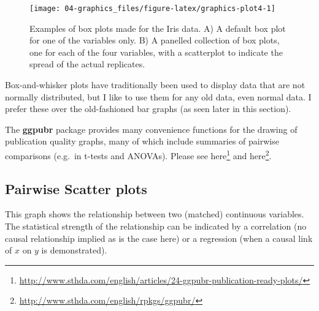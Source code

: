 \documentclass[english,10pt,a4paper,oneside]{book}
\renewcommand{\href}[2]{#2\footnote{\url{#1}}}
\let\rmarkdownfootnote\footnote%
\def\footnote{\protect\rmarkdownfootnote}
\theoremstyle{definition}
\theoremstyle{definition}
\theoremstyle{definition}
\theoremstyle{remark}
\begin{document}
\begin{figure}
\texttt{[image: 04-graphics\_files/figure-latex/graphics-plot4-1]} \caption{Examples of box plots made for the Iris data. A) A default box plot for one of the variables only. B) A panelled collection of box plots, one for each of the four variables, with a scatterplot to indicate the spread of the actual replicates.}\label{fig:graphics-plot4}
\end{figure}

Box-and-whisker plots have traditionally been used to display data that
are not normally distributed, but I like to use them for any old data,
even normal data. I prefer these over the old-fashioned bar graphs (as
seen later in this section).

The \textbf{ggpubr} package provides many convenience functions for the
drawing of publication quality graphs, many of which include summaries
of pairwise comparisons (e.g.~in t-tests and ANOVAs). Please see
\href{http://www.sthda.com/english/articles/24-ggpubr-publication-ready-plots/}{here}
and \href{http://www.sthda.com/english/rpkgs/ggpubr/}{here}.

\hypertarget{pairwise-scatter-plots}{%
\subsection{Pairwise Scatter plots}\label{pairwise-scatter-plots}}

This graph shows the relationship between two (matched) continuous
variables. The statistical strength of the relationship can be indicated
by a correlation (no causal relationship implied as is the case here) or
a regression (when a causal link of \(x\) on \(y\) is demonstrated).
\end{document}
